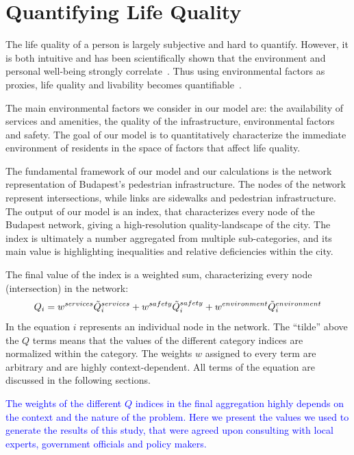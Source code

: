 \section{Quantifying Life Quality}
The life quality of a person is largely subjective and hard to quantify. However, it is both intuitive and has been scientifically shown that the environment and personal well-being strongly correlate~\cite{Rosow1961Social}. Thus using environmental factors as proxies, life quality and livability becomes quantifiable~\cite{Kahneman2006Developments}.

The main environmental factors we consider in our model are: the availability of services and amenities, the quality of the infrastructure, environmental factors and safety. The goal of our model is to quantitatively characterize the immediate environment of residents in the space of factors that affect life quality.

The fundamental framework of our model and our calculations is the network representation of Budapest’s pedestrian infrastructure. The nodes of the network represent intersections, while links are sidewalks and pedestrian infrastructure. The output of our model is an index, that characterizes every node of the Budapest network, giving a high-resolution quality-landscape of the city. The index is ultimately a number aggregated from multiple sub-categories, and its main value is highlighting inequalities and relative deficiencies within the city.

The final value of the index is a weighted sum, characterizing every node (intersection) in the network:
\begin{equation} \label{final_Q}
	Q_i =w^{services}\Tilde{Q}_i^{services} + w^{safety} \Tilde{Q}_i^{safety} + w^{environment}\Tilde{Q}_i^{environment}
\end{equation}
In the equation $i$ represents an individual node in the network. The ``tilde'' above the $Q$ terms means that the values of the different category indices are normalized within the category. The weights $w$ assigned to every term are arbitrary and are highly context-dependent. All terms of the equation are discussed in the following sections.

\textcolor{blue}{The weights of the different $Q$ indices in the final aggregation highly depends on the context and the nature of the problem. Here we present the values we used to generate the results of this study, that were agreed upon consulting with local experts, government officials and policy makers.}


